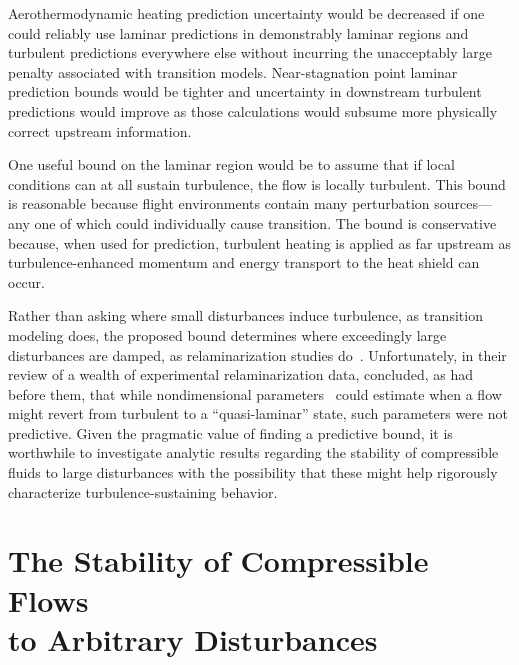 Aerothermodynamic heating prediction uncertainty would be decreased if one could
reliably use laminar predictions in demonstrably laminar regions and turbulent
predictions everywhere else without incurring the unacceptably large penalty
associated with transition models.  Near-stagnation point laminar prediction
bounds would be tighter and uncertainty in downstream turbulent predictions
would improve as those calculations would subsume more physically correct
upstream information.

One useful bound on the laminar region would be to assume that if local
conditions can at all sustain turbulence, the flow is locally turbulent.  This
bound is reasonable because flight environments contain many perturbation
sources--- any one of which could individually cause transition.  The bound is
conservative because, when used for prediction, turbulent heating is applied as
far upstream as turbulence-enhanced momentum and energy transport to the heat
shield can occur.

Rather than asking where small disturbances induce turbulence, as
transition modeling does, the proposed bound determines where exceedingly
large disturbances are damped, as relaminarization studies
do~\citep{Narasimha1973Relaminarization, Narasimha1979Relaminarization,
Iida1998Relaminarization, Blackwelder1972Largescale,
Schraub1965Study, Ichimiya1998Properties, Talamelli2002Experimental,
Mukund2006Relaminarization, Bourassa2009Experimental}.  Unfortunately,
in their \citeyear{Cal2008Similarity} review of a wealth of experimental
relaminarization data, \citet{Cal2008Similarity} concluded, as
had \citet{Sreenivasan1982Laminarescent} before them, that while
nondimensional parameters~\citep[e.g.][]{Launder1964Laminarization} could
estimate when a flow might revert from turbulent to a ``quasi-laminar''
state, such parameters were not predictive.
%
Given the pragmatic value of finding a predictive bound, it is worthwhile
to investigate analytic results regarding the stability of compressible fluids
to large disturbances with the possibility that these might help rigorously characterize
turbulence-sustaining behavior.

\section[The Stability of Compressible Flows to Arbitrary Disturbances]
        {The Stability of Compressible Flows\\to Arbitrary Disturbances}
\label{sec:energyperturbationtheory}

